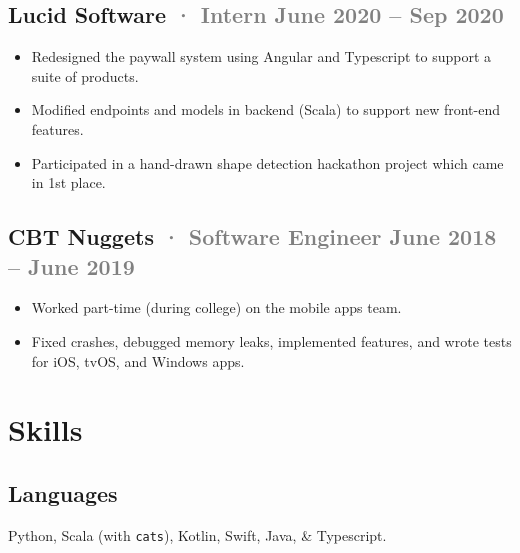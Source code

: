\documentclass[12pt]{article} %
\providecommand{\tightlist}{%
  \setlength{\itemsep}{0pt}\setlength{\parskip}{0pt}}
\renewcommand{\emph}[1]{%
  \textcolor{gray}{#1}%
}
\begin{document}
\begin{paracol}{2}
\begin{raggedright}
\hypertarget{lucid-software-intern-june-2020-sep-2020}{%
\subsection{\texorpdfstring{Lucid Software \emph{· \small Intern
\hfill June 2020 -- Sep
2020}}{Lucid Software · Intern June 2020 -- Sep 2020}}\label{lucid-software-intern-june-2020-sep-2020}}

\begin{itemize}
\tightlist
\item
  Redesigned the paywall system using Angular and Typescript to support
  a suite of products.
\item
  Modified endpoints and models in backend (Scala) to support new
  front-end features.
\item
  Participated in a hand-drawn shape detection hackathon project which
  came in 1st place.
\end{itemize}

\hypertarget{cbt-nuggets-software-engineer-june-2018-june-2019}{%
\subsection{\texorpdfstring{CBT Nuggets \emph{· \small Software Engineer
\hfill June 2018 -- June
2019}}{CBT Nuggets · Software Engineer June 2018 -- June 2019}}\label{cbt-nuggets-software-engineer-june-2018-june-2019}}

\begin{itemize}
\tightlist
\item
  Worked part-time (during college) on the mobile apps team.
\item
  Fixed crashes, debugged memory leaks, implemented features, and wrote
  tests for iOS, tvOS, and Windows apps.
\end{itemize}

\switchcolumn 

\hypertarget{skills}{%
\section{Skills}\label{skills}}

\hypertarget{languages}{%
\subsection{Languages}\label{languages}}

Python, Scala (with \texttt{cats}), Kotlin, Swift, Java, \& Typescript.


\end{raggedright}
\end{paracol}
\end{document}
